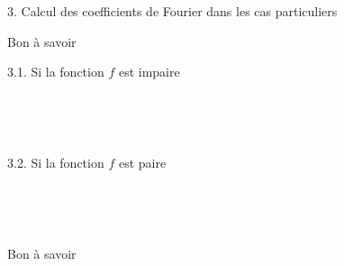 \documentclass[11pt,a4paper]{article}
\newcommand{\cadre}[1]
{\begin{bclogo}[couleur = white,logo=,  arrondi = 0.1,barre=none]
~~
{%
\rule{0mm}{#1mm}}\par
\medskip
~~
\end{bclogo}}
\begin{document}
\newpage

\begin{mybox}
    3. Calcul des coefficients de Fourier dans les cas particuliers 
\end{mybox}



\begin {center}
\begin{minipage}{14cm}{

\begin{bclogo}[couleur = white,logo=\bcetoile,  arrondi = 0.1]
{Bon à savoir} 

\vspace{3cm}

\end{bclogo}

}

\end{minipage}

\end{center}

\vfill

\begin{mybox}
    3.1. Si la fonction $f$ est impaire
\end{mybox}

\vspace{3mm}
\cadre{30}

\vfill

\begin{mybox}
   3.2. Si la fonction $f$ est paire
\end{mybox}
\vspace{3mm}
\cadre{40}

\vfill 



\begin {center}
\begin{minipage}{14cm}{

\begin{bclogo}[couleur = white,logo=\bcetoile,  arrondi = 0.1]
{Bon à savoir} 

\vspace{3cm}

\end{bclogo}

}

\end{minipage}

\end{center}

\vfill 
\end{document}
